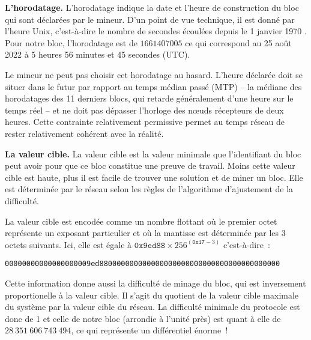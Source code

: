 
\textbf{L'horodatage.} L'horodatage indique la date et l'heure de construction du bloc qui sont déclarées par le mineur. D'un point de vue technique, il est donné par l'heure Unix, c'est-à-dire le nombre de secondes écoulées depuis le 1\ier{} janvier 1970 . Pour notre bloc, l'horodatage est de $1661407005$ ce qui correspond au 25 août 2022 à 5 heures 56 minutes et 45 secondes (UTC).

Le mineur ne peut pas choisir cet horodatage au hasard. L'heure déclarée doit se situer dans le futur par rapport au temps médian passé (MTP) -- la médiane des horodatages des 11 derniers blocs, qui retarde généralement d'une heure sur le temps réel -- et ne doit pas dépasser l'horloge des nœuds récepteurs de deux heures. Cette contrainte relativement permissive permet au temps réseau de rester relativement cohérent avec la réalité.


\textbf{La valeur cible.} La valeur cible est la valeur minimale que l'identifiant du bloc peut avoir pour que ce bloc constitue une preuve de travail. Moins cette valeur cible est haute, plus il est facile de trouver une solution et de miner un bloc. Elle est déterminée par le réseau selon les règles de l'algorithme d'ajustement de la difficulté.

La valeur cible est encodée comme un nombre flottant où le premier octet représente un exposant particulier et où la mantisse est déterminée par les 3 octets suivants. Ici, elle est égale à $\mathtt{0x9ed88} \times 256^{(\mathtt{0x17} - 3)}$ c'est-à-dire~:

\begin{Verbatim}[fontsize=\footnotesize]
00000000000000000009ed880000000000000000000000000000000000000000
\end{Verbatim}

Cette information donne aussi la difficulté de minage du bloc, qui est inversement proportionelle à la valeur cible. Il s'agit du quotient de la valeur cible maximale du système par la valeur cible du réseau. La difficulté minimale du protocole est donc de 1 et celle de notre bloc (arrondie à l'unité près) est quant à elle de $28~351~606~743~494$, ce qui représente un différentiel énorme~!

